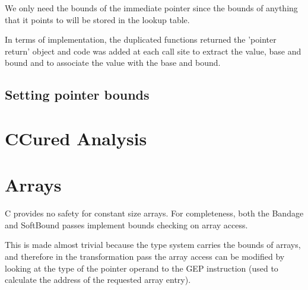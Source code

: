 We only need the bounds of the immediate pointer since the bounds of anything that it points to will be stored in the lookup table.

In terms of implementation, the duplicated functions returned the 'pointer return' object and code was added at each call site to extract the value, base and bound and to associate the value with the base and bound.

\subsection{Setting pointer bounds}

\section{CCured Analysis}

%
%
%
%
%
%
%

\section{Arrays}

C provides no safety for constant size arrays.
For completeness, both the Bandage and SoftBound passes implement bounds checking on array access.

This is made almost trivial because the type system carries the bounds of arrays, and therefore in the transformation pass the array access can be modified by looking at the type of the pointer operand to the GEP instruction (used to calculate the address of the requested array entry).
